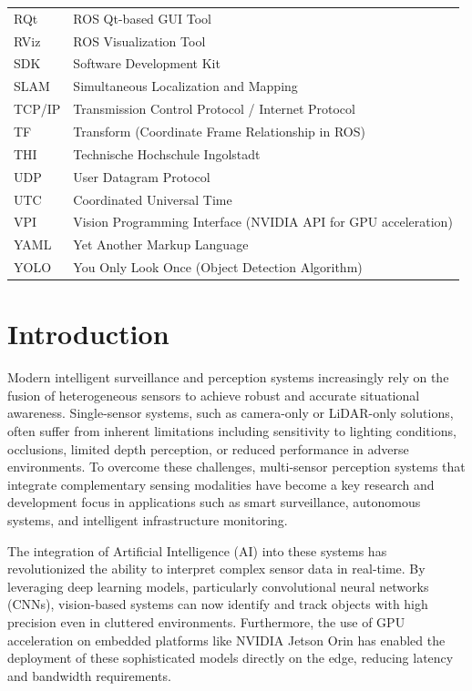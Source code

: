 \documentclass[12pt,a4paper]{report}
\begin{document}
\begin{longtable}{@{}p{}p{}@{}}
RQt & ROS Qt-based GUI Tool \\
RViz & ROS Visualization Tool \\
SDK & Software Development Kit \\
SLAM & Simultaneous Localization and Mapping \\
TCP/IP & Transmission Control Protocol / Internet Protocol \\
TF & Transform (Coordinate Frame Relationship in ROS) \\
THI & Technische Hochschule Ingolstadt \\
UDP & User Datagram Protocol \\
UTC & Coordinated Universal Time \\
VPI & Vision Programming Interface (NVIDIA API for GPU acceleration) \\
YAML & Yet Another Markup Language \\
YOLO & You Only Look Once (Object Detection Algorithm) \\
\bottomrule
\end{longtable}

\clearpage
{}

\chapter{Introduction}

Modern intelligent surveillance and perception systems increasingly rely on the fusion of heterogeneous sensors to achieve robust and accurate situational awareness. Single-sensor systems, such as camera-only or LiDAR-only solutions, often suffer from inherent limitations including sensitivity to lighting conditions, occlusions, limited depth perception, or reduced performance in adverse environments. To overcome these challenges, multi-sensor perception systems that integrate complementary sensing modalities have become a key research and development focus in applications such as smart surveillance, autonomous systems, and intelligent infrastructure monitoring. 

The integration of Artificial Intelligence (AI) into these systems has revolutionized the ability to interpret complex sensor data in real-time. By leveraging deep learning models, particularly convolutional neural networks (CNNs), vision-based systems can now identify and track objects with high precision even in cluttered environments. Furthermore, the use of GPU acceleration on embedded platforms like NVIDIA Jetson Orin has enabled the deployment of these sophisticated models directly on the edge, reducing latency and bandwidth requirements.
\end{document}
